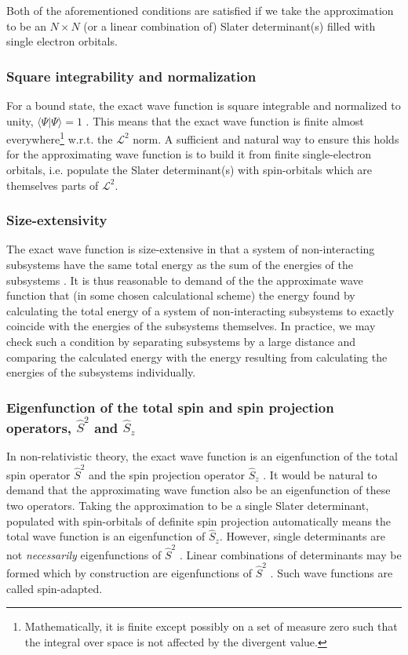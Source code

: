 \documentclass[../../master.tex]{subfiles}
\begin{document}
Both of the aforementioned conditions are satisfied if we take the approximation to be an $N \times N$ (or a linear combination of) Slater determinant(s) filled with single electron orbitals.

\subsubsection*{Square integrability and normalization}
For a bound state, the exact wave function is square integrable and normalized to unity, $\langle \Psi|\Psi\rangle = 1$ \cite{helgaker}. This means that the exact wave function is finite almost everywhere\footnote{Mathematically, it is finite except possibly on a set of measure zero such that the integral over space is not affected by the divergent value.} w.r.t. the $\mathcal{L}^2$ norm. A sufficient and natural way to ensure this holds for the approximating wave function is to build it from finite single-electron orbitals, i.e. populate the Slater determinant(s) with spin-orbitals which are themselves parts of $\mathcal{L}^2$. 

\subsubsection*{Size-extensivity}
The exact wave function is size-extensive in that a system of non-interacting subsystems have the same total energy as the sum of the energies of the subsystems \cite{helgaker}. It is thus reasonable to demand of the the approximate wave function that (in some chosen calculational scheme) the energy found by calculating the total energy of a system of non-interacting subsystems to exactly coincide with the energies of the subsystems themselves. In practice, we may check such a condition by separating subsystems by a large distance and comparing the calculated energy with the energy resulting from calculating the energies of the subsystems individually. 

\subsubsection*{Eigenfunction of the total spin and spin projection operators, $\hat S^2$ and $\hat S_z$}
In non-relativistic theory, the exact wave function is an eigenfunction of the total spin operator $\hat S^2$ and the spin projection operator $\hat S_z$ \cite{gross}. It would be natural to demand that the approximating wave function also be an eigenfunction of these two operators. Taking the approximation to be a single Slater determinant, populated with spin-orbitals of definite spin projection automatically means the total wave function is an eigenfunction of $\hat S_z$. However, single determinants are not \emph{necessarily} eigenfunctions of $\hat S^2$ \cite{szabo}. Linear combinations of determinants may be formed which by construction are eigenfunctions of $\hat S^2$ \cite{helgaker}. Such wave functions are called spin-adapted. 
\end{document}
